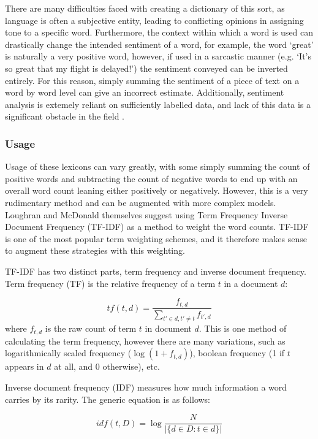 There are many difficulties faced with creating a dictionary of this sort, as language is often a subjective entity, leading to conflicting opinions in assigning tone to a specific word. Furthermore, the context within which a word is used can drastically change the intended sentiment of a word, for example, the word `great' is naturally a very positive word, however, if used in a sarcastic manner (e.g. `It's so great that my flight is delayed!') the sentiment conveyed can be inverted entirely. For this reason, simply summing the sentiment of a piece of text on a word by word level can give an incorrect estimate. Additionally, sentiment analysis is extemely reliant on sufficiently labelled data, and lack of this data is a significant obstacle in the field \parencite{madhoushi2015sentiment}.

\subsubsection{Usage}
Usage of these lexicons can vary greatly, with some simply summing the count of positive words and subtracting the count of negative words to end up with an overall word count leaning either positively or negatively. However, this is a very rudimentary method and can be augmented with more complex models. Loughran and McDonald themselves suggest using Term Frequency Inverse Document Frequency (TF-IDF) as a method to weight the word counts. TF-IDF is one of the most popular term weighting schemes, and it therefore makes sense to augment these strategies with this weighting.

TF-IDF has two distinct parts, term frequency and inverse document frequency. Term frequency (TF) is the relative frequency of a term $t$ in a document $d$:

\begin{equation}
tf(t,d) =  \frac{f_{t,d}}{\sum_{t'\in d, t' \neq t} f_{t',d}}
\end{equation}
where $f_{t,d}$ is the raw count of term $t$ in document $d$. This is one method of calculating the term frequency, however there are many variations, such as logarithmically scaled frequency ($\log(1 + f_{t,d})$), boolean frequency (1 if $t$ appears in $d$ at all, and 0 otherwise), etc.

Inverse document frequency (IDF) measures how much information a word carries by its rarity. The generic equation is as follows:

\begin{equation}
idf(t,D) = \log \frac{N}{|\{d \in D: t \in d\}|}
\end{equation}

